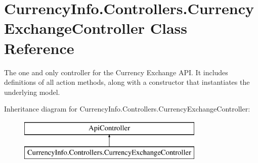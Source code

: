 \hypertarget{class_currency_info_1_1_controllers_1_1_currency_exchange_controller}{\section{Currency\-Info.\-Controllers.\-Currency\-Exchange\-Controller Class Reference}
\label{class_currency_info_1_1_controllers_1_1_currency_exchange_controller}
}


The one and only controller for the Currency Exchange A\-P\-I. It includes definitions of all action methods, along with a constructor that instantiates the underlying model.  


Inheritance diagram for Currency\-Info.\-Controllers.\-Currency\-Exchange\-Controller\-:\begin{figure}[H]
\begin{center}
\leavevmode
\includegraphics[height=2.000000cm]{class_currency_info_1_1_controllers_1_1_currency_exchange_controller}
\end{center}
\end{figure}
